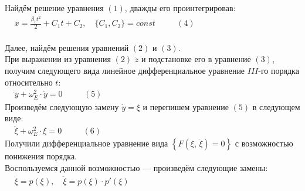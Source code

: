 \documentclass[oneside,final,14pt]{extarticle}
\begin{document}
		\noindent Найдём решение уравнения $(1)$, дважды его проинтегрировав: \\
		
		\begin{math}
			\begin{aligned}
				& x = \frac{\beta_{1}t^{2}}{2} + C_{1}t + C_{2}, \quad \{C_{1}, C_{2}\} = const \quad && (4)
			\end{aligned}
		\end{math} \\\\
		
		\noindent Далее, найдём решения уравнений $(2)$ и $(3)$. \\
		
		\noindent При выражении из уравнения $(2)$ $\dot{z}$ и подстановке его в уравнение $(3)$, получим следующего вида линейное дифференциальное уравнение $III$-го порядка относительно $t$: \\
		
		\begin{math}
			\begin{aligned}
				& \dddot{y} + \omega_{E}^{2} \cdot \dot{y} = 0 \quad && (5)
			\end{aligned}
		\end{math} \\
		
		\noindent Произведём следующую замену $\dot{y} = \xi$ и перепишем уравнение $(5)$ в следующем виде: \\
		
		\begin{math}
			\begin{aligned}
				& \ddot{\xi} + \omega_{E}^{2} \cdot \xi = 0 \quad && (6)
			\end{aligned}
		\end{math} \\
		
		\noindent Получили дифференциальное уравнение вида $\left\{F(\xi,\, \ddot{\xi}) = 0\right\}$ с возможностью понижения порядка. \\
		
		\noindent Воспользуемся данной возможностью --- произведём следующие замены: \\
		
		\begin{math}
			\begin{aligned}
				& \dot{\xi} = p(\xi), \quad \ddot{\xi} = p(\xi) \cdot p'(\xi)
			\end{aligned}
		\end{math} \\
		
\end{document}
